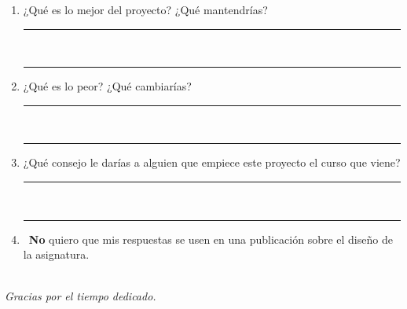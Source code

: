 
\begin{enumerate}[leftmargin=*,resume]

\item ¿Qu\'e es lo mejor del proyecto? ¿Qu\'e mantendr\'ias?\\[8pt]
\rule{\linewidth}{0.4pt}\\[10pt]
\rule{\linewidth}{0.4pt}

\item ¿Qu\'e es lo peor? ¿Qu\'e cambiar\'ias?\\[8pt]
\rule{\linewidth}{0.4pt}\\[10pt]
\rule{\linewidth}{0.4pt}

\item ¿Qu\'e consejo le dar\'ias a alguien que empiece este proyecto el curso
que viene?\\[8pt]
\rule{\linewidth}{0.4pt}\\[10pt]
\rule{\linewidth}{0.4pt}

\item \cb\ \textbf{No} quiero que mis respuestas se usen en una publicaci\'on
sobre el diseño de la asignatura.

\end{enumerate}

\bigskip
\begin{center}
\noindent\hrulefill\\
\textit{Gracias por el tiempo dedicado.}
\end{center}



